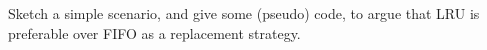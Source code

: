   Sketch a simple scenario, and give some (pseudo) code, to argue that
  LRU is preferable over FIFO as a replacement strategy.
